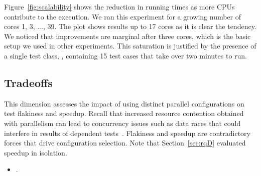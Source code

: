 Figure~\ref{fig:scalability} shows the reduction in running times as
more CPUs contribute to the execution.  We ran this experiment for a
growing number of cores 1, 3, ..., 39.  The plot shows results up to
17 cores as it is clear the tendency.  We noticed that improvements
are marginal after three cores, which is the basic setup we used in
other experiments.  This saturation is justified by the presence of a
single test class, , containing 15 test
cases that take over two minutes to run.


\begin{center}
\end{center}

\subsection{Tradeoffs}
\label{sec:rq6-tradeoffs}


This dimension assesses the impact of using distinct parallel
configurations on test flakiness and speedup.  Recall that increased
resource contention obtained with parallelism can lead to concurrency
issues such as data races that could interfere in results of dependent
tests~\cite{luo-etal-fse2014,bell-etal-esecfse2015}.  Flakiness and
speedup are contradictory forces that drive configuration selection.
Note that Section~\ref{sec:rqD} evaluated speedup in isolation.

\begin{itemize}
    \item \numRQIssuesOne{}. \textbf{\RQIssuesOne{}}
\end{itemize}




